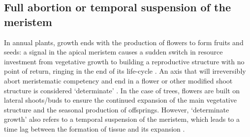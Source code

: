 \documentclass{article}
\begin{document}
	\subsection*{Full abortion or temporal suspension of the meristem}
	In annual plants, growth ends with the production of flowers to form fruits and seeds: a signal in the apical meristem causes a sudden switch in resource investment from vegetative growth to building a reproductive structure with no point of return, ringing in the end of its life-cycle \citep{poethigPhaseChangeRegulation2003, huijserControlDevelopmentalPhase2011}. An axis that will irreversibly abort meristematic competency and end in a flower or other modified shoot structure is considered `determinate' \citep{barthelemyPlantArchitectureDynamic2007}. In the case of trees, flowers are built on lateral shoots/buds to ensure the continued expansion of the main vegetative structure and the seasonal production of offsprings. However, `determinate growth' also refers to a temporal suspension of the meristem, which leads to a time lag between the formation of tissue and its expansion \citep{kozlowskiSeedGerminationOntogeny2012, halleTropicalTreesForests1978}. 
	
	
	
		
	
\end{document}
